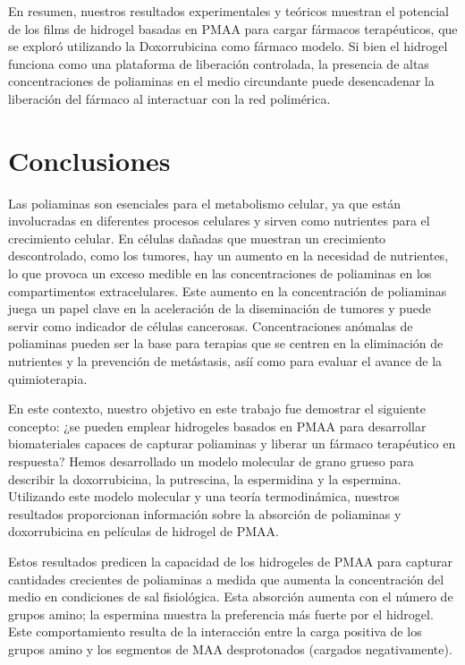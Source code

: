 En resumen, nuestros resultados experimentales y te\'oricos muestran el potencial de los films de hidrogel basadas en PMAA para cargar f\'armacos terap\'euticos, que se explor\'o utilizando la Doxorrubicina como f\'armaco modelo. Si bien el hidrogel funciona como una plataforma de liberaci\'on controlada, la presencia de altas concentraciones de poliaminas en el medio circundante puede desencadenar la liberaci\'on del f\'armaco al interactuar con la red polim\'erica.



\section{Conclusiones}

Las poliaminas son esenciales para el metabolismo celular, ya que est\'an involucradas en diferentes procesos celulares y sirven como nutrientes para el crecimiento celular. En c\'elulas da\~nadas que muestran un crecimiento descontrolado, como los tumores, hay un aumento en la necesidad de nutrientes, lo que provoca un exceso medible en las concentraciones de poliaminas en los compartimentos extracelulares. Este aumento en la concentraci\'on de poliaminas juega un papel clave en la aceleraci\'on de la diseminaci\'on de tumores y puede servir como indicador de c\'elulas cancerosas. Concentraciones an\'omalas de poliaminas pueden ser la base para terapias que se centren en la eliminaci\'on de nutrientes y la prevenci\'on de met\'astasis, así\'i como para evaluar el avance de la quimioterapia.

En este contexto, nuestro objetivo en este trabajo fue demostrar el siguiente concepto: ¿se pueden emplear hidrogeles basados en PMAA para desarrollar biomateriales capaces de capturar poliaminas y liberar un f\'armaco terap\'eutico en respuesta? Hemos desarrollado un modelo molecular de grano grueso para describir la doxorrubicina, la putrescina, la espermidina y la espermina. Utilizando este modelo molecular y una teor\'ia termodin\'amica, nuestros resultados proporcionan información sobre la absorci\'on de poliaminas y doxorrubicina en pel\'iculas de hidrogel de PMAA.

Estos resultados predicen la capacidad de los hidrogeles de PMAA para capturar cantidades crecientes de poliaminas a medida que aumenta la concentraci\'on del medio en condiciones de sal fisiol\'ogica. Esta absorci\'on aumenta con el n\'umero de grupos amino; la espermina muestra la preferencia m\'as fuerte por el hidrogel. Este comportamiento resulta de la interacci\'on entre la carga positiva de los grupos amino y los segmentos de MAA desprotonados (cargados negativamente).



